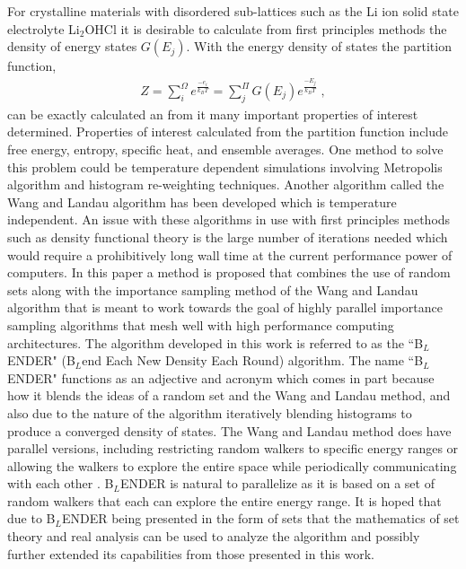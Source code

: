 \documentclass[aps,prl,reprint,superscriptaddress,showkeys]{revtex4-1}
\begin{document}
For crystalline  materials  with disordered sub-lattices such as the Li ion solid state electrolyte  Li$_2$OHCl it is desirable to calculate from first principles methods the density of energy states $G(E_j)$. With the energy density of states the partition function,
\begin{equation}
\begin{split}
Z = \sum_{i}^{\Omega}e^{\frac{-e_i}{k_B T} }= \sum_{j}^{\Pi}G(E_j)e^{\frac{-E_j}{k_BT}} \;,
\end{split}
\end{equation}
 can be exactly calculated an from it many important properties of interest determined. Properties of interest calculated from the partition function include  free energy, entropy, specific heat, and ensemble averages. One method to solve this problem could be temperature dependent simulations involving  Metropolis algorithm and histogram re-weighting techniques\cite{landau_MC_simulations}.  Another algorithm called the  Wang and Landau algorithm\cite{WL_phys_rev_lett} has been developed which is temperature independent. An issue with these algorithms in use with first principles methods such as density functional theory is the large number of iterations needed which would require a prohibitively long wall time at the current performance power of computers.  In this paper a method is proposed that combines the use of random sets along with the importance sampling method of the Wang and Landau algorithm that is meant to work towards the goal of highly parallel importance sampling algorithms that mesh well with high performance computing architectures. The algorithm developed in this work is referred to as the ``B$_{L}$ENDER" (B$_{L}$end Each New Density Each Round) algorithm. The name ``B$_{L}$ENDER" functions as an  adjective and acronym  which comes in part because how it blends the ideas of a random set and the Wang and Landau method, and also due to the nature of the algorithm iteratively blending histograms to produce a converged density of states.  The Wang and Landau method does have parallel versions, including  restricting random walkers to specific energy ranges or allowing the walkers to explore the entire space while periodically communicating with each other \cite{MP_Wang_Landau,P_imp_Wang_Landau, Hframe_Wang_Landau}.  B$_{L}$ENDER is natural to parallelize as it is based on a set of random walkers that each can explore the entire energy range. It is hoped that due to B$_{L}$ENDER being presented in the form of sets that the mathematics of set theory and real analysis can be used to analyze the algorithm and possibly further extended its capabilities from those presented in this work. 
\end{document}
